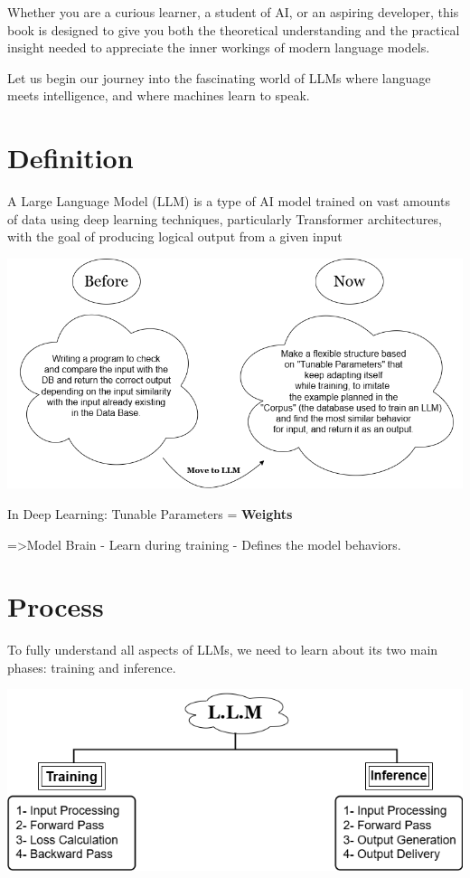 \documentclass[12pt]{article}
\begin{document}
Whether you are a curious learner, a student of AI, or an aspiring developer, this book is designed to give you both the theoretical understanding and the practical insight needed to appreciate the inner workings of modern language models. 

Let us begin our journey into the fascinating world of LLMs where language meets intelligence, and where machines learn to speak.
\newpage

\section{Definition}
A Large Language Model (LLM) is a type of AI model trained on vast amounts of data using deep learning techniques, particularly Transformer architectures, with the goal of producing logical output from a given input

\vspace{1em}
\hspace{-0.8cm}
\begin{center}
\includegraphics[width=1\textwidth]{images/llm1.png}
\end{center}


In Deep Learning: Tunable Parameters = \textbf{Weights}

=>Model Brain - Learn during training - Defines the model behaviors.
\section{Process}
To fully understand all aspects of LLMs, we need to learn about its two main phases: training and inference.

\vspace{3em}
\hspace{-1.4cm}
\includegraphics[width=1.1\textwidth]{images/llm2.png}
\end{document}
